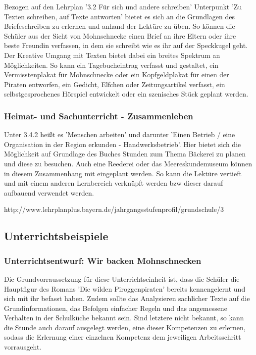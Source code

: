 {Bezogen auf den Lehrplan '3.2 Für sich und andere schreiben' Unterpunkt 'Zu Texten schreiben, auf Texte antworten' bietet es sich an die Grundlagen des Briefeschreiben zu erlernen und anhand der Lektüre zu üben. So können die Schüler aus der Sicht von Mohnschnecke einen Brief an ihre Eltern oder ihre beste Freundin verfassen, in dem sie schreibt wie es ihr auf der Speckkugel geht. Der Kreative Umgang mit Texten bietet dabei ein breites Spektrum an Möglichkeiten. So kann ein Tagebucheintrag verfasst und gestaltet, ein Vermisstenplakat für Mohnschnecke oder ein Kopfgeldplakat für einen der Piraten entworfen, ein Gedicht, Elfchen oder Zeitungsartikel verfasst, ein selbstgesprochenes Hörspiel entwickelt oder ein szenisches Stück geplant werden.

\subsubsection{Heimat- und Sachunterricht - Zusammenleben}

Unter 3.4.2 heißt es 'Menschen arbeiten' und darunter 'Einen Betrieb / eine Organisation in der Region erkunden - Handwerksbetrieb'. Hier bietet sich die Möglichkeit auf Grundlage des Buches Stunden zum Thema Bäckerei zu planen und diese zu besuchen. Auch eine Reederei oder das Meereskundemuseum können in diesem Zusammenhang mit eingeplant werden. So kann die Lektüre vertieft und mit einem anderen Lernbereich verknüpft werden bzw dieser darauf aufbauend verwendet werden.


http://www.lehrplanplus.bayern.de/jahrgangsstufenprofil/grundschule/3

\subsection{Unterrichtsbeispiele}



\subsubsection{Unterrichtsentwurf: Wir backen Mohnschnecken}

Die Grundvorraussetzung für diese Unterrichtseinheit ist, dass die Schüler die Hauptfigur des Romans 'Die wilden Piroggenpiraten' bereits kennengelernt und sich mit ihr befasst haben. Zudem sollte das Analysieren sachlicher Texte auf die Grundinformationen, das Befolgen einfacher Regeln und das angemessene Verhalten in der Schulküche bekannt sein. Sind letztere nicht bekannt, so kann die Stunde auch darauf ausgelegt werden, eine dieser Kompetenzen zu erlernen, sodass die Erlernung einer einzelnen Kompetenz dem jeweiligen Arbeitsschritt vorrausgeht.

}

